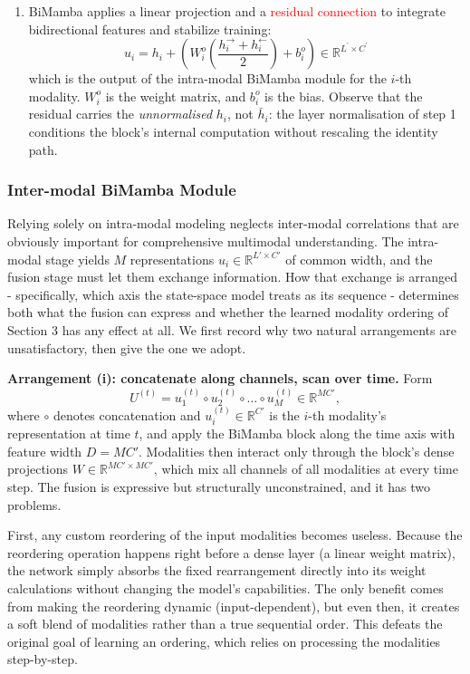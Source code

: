 \documentclass[11pt,a4paper]{article}
\newcommand{\R}{\mathbb{R}}
\begin{document}
\begin{enumerate}
	\item BiMamba applies a linear projection and a \hypertarget{residual}{\textcolor{red}{residual connection}} to integrate bidirectional features and stabilize training:
	$$u_{i}=h_{i}+\left(W_{i}^{o}\left(\frac{h_{i}^{\rightarrow}+h_{i}^{\leftarrow}}{2}\right)+b_{i}^{o}\right)\in\R^{L^{\prime}\times C^{\prime}}$$
	which is the output of the intra-modal BiMamba module for the $i$-th modality. $W_{i}^{o}$ is the weight matrix, and $b_{i}^{o}$ is the bias. Observe that the residual carries the \emph{unnormalised} $h_i$, not $\bar{h}_i$: the layer normalisation of step 1 conditions the block's internal computation without rescaling the identity path.
	\end{enumerate}

	\subsubsection{Inter-modal BiMamba Module}
	Relying solely on intra-modal modeling neglects inter-modal correlations that are obviously important for comprehensive multimodal understanding. The intra-modal stage yields $M$ representations $u_i \in \R^{L' \times C'}$ of common width, and the fusion stage must let them exchange information. How that exchange is arranged - specifically, which axis the state-space model treats as its sequence - determines both what the fusion can express and whether the learned modality ordering of Section 3 has any effect at all. We first record why two natural arrangements are unsatisfactory, then give the one we adopt.

	\textbf{Arrangement (i): concatenate along channels, scan over time.} Form $$U^{(t)} = u_1^{(t)} \circ u_2^{(t)} \circ \dots \circ u_M^{(t)} \in \R^{MC'},$$ where $\circ$ denotes concatenation and $u_i^{(t)} \in \R^{C'}$ is the $i$-th modality's representation at time $t$, and apply the BiMamba block along the time axis with feature width $D = MC'$. Modalities then interact only through the block's dense projections $W \in \R^{MC' \times MC'}$, which mix all channels of all modalities at every time step. The fusion is expressive but structurally unconstrained, and it has two problems.

	First, any custom reordering of the input modalities becomes useless. Because the reordering operation happens right before a dense layer (a linear weight matrix), the network simply absorbs the fixed rearrangement directly into its weight calculations without changing the model's capabilities. The only benefit comes from making the reordering dynamic (input-dependent), but even then, it creates a soft blend of modalities rather than a true sequential order. This defeats the original goal of learning an ordering, which relies on processing the modalities step-by-step.
	
\end{document}
